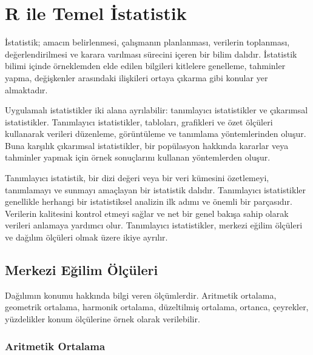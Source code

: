 \documentclass[
  letterpaper,
  DIV=11,
  numbers=noendperiod]{scrreprt}
\begin{document}

\hypertarget{r-ile-temel-istatistik}{%
\chapter*{R ile Temel İstatistik}\label{r-ile-temel-istatistik}}


İstatistik; amacın belirlenmesi, çalışmanın planlanması, verilerin
toplanması, değerlendirilmesi ve karara varılması sürecini içeren bir
bilim dalıdır. İstatistik bilimi içinde örneklemden elde edilen
bilgileri kitlelere genelleme, tahminler yapma, değişkenler arasındaki
ilişkileri ortaya çıkarma gibi konular yer almaktadır.

Uygulamalı istatistikler iki alana ayrılabilir: tanımlayıcı
istatistikler ve çıkarımsal istatistikler. Tanımlayıcı istatistikler,
tabloları, grafikleri ve özet ölçüleri kullanarak verileri düzenleme,
görüntüleme ve tanımlama yöntemlerinden oluşur. Buna karşılık çıkarımsal
istatistikler, bir popülasyon hakkında kararlar veya tahminler yapmak
için örnek sonuçlarını kullanan yöntemlerden oluşur.

Tanımlayıcı istatistik, bir dizi değeri veya bir veri kümesini
özetlemeyi, tanımlamayı ve sunmayı amaçlayan bir istatistik dalıdır.
Tanımlayıcı istatistikler genellikle herhangi bir istatistiksel analizin
ilk adımı ve önemli bir parçasıdır. Verilerin kalitesini kontrol etmeyi
sağlar ve net bir genel bakışa sahip olarak verileri anlamaya yardımcı
olur. Tanımlayıcı istatistikler, merkezi eğilim ölçüleri ve dağılım
ölçüleri olmak üzere ikiye ayrılır.

\hypertarget{merkezi-eux11filim-uxf6luxe7uxfcleri}{%
\section*{Merkezi Eğilim
Ölçüleri}\label{merkezi-eux11filim-uxf6luxe7uxfcleri}}


Dağılımın konumu hakkında bilgi veren ölçümlerdir. Aritmetik ortalama,
geometrik ortalama, harmonik ortalama, düzeltilmiş ortalama, ortanca,
çeyrekler, yüzdelikler konum ölçülerine örnek olarak verilebilir.

\hypertarget{aritmetik-ortalama}{%
\subsection*{Aritmetik Ortalama}\label{aritmetik-ortalama}}
\end{document}
